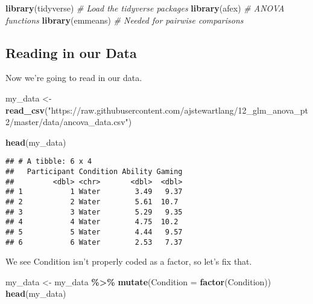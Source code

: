 \documentclass[
]{book}
\newenvironment{Shaded}{\begin{snugshade}}{\end{snugshade}}
\newcommand{\AttributeTok}[1]{\textcolor[rgb]{0.13,0.29,0.53}{#1}}
\newcommand{\CommentTok}[1]{\textcolor[rgb]{0.56,0.35,0.01}{\textit{#1}}}
\newcommand{\FunctionTok}[1]{\textcolor[rgb]{0.13,0.29,0.53}{\textbf{#1}}}
\newcommand{\NormalTok}[1]{#1}
\newcommand{\OtherTok}[1]{\textcolor[rgb]{0.56,0.35,0.01}{#1}}
\newcommand{\SpecialCharTok}[1]{\textcolor[rgb]{0.81,0.36,0.00}{\textbf{#1}}}
\newcommand{\StringTok}[1]{\textcolor[rgb]{0.31,0.60,0.02}{#1}}
\begin{document}
\begin{Shaded}
\begin{Highlighting}[]
\FunctionTok{library}\NormalTok{(tidyverse) }\CommentTok{\# Load the tidyverse packages}
\FunctionTok{library}\NormalTok{(afex) }\CommentTok{\# ANOVA functions}
\FunctionTok{library}\NormalTok{(emmeans) }\CommentTok{\# Needed for pairwise comparisons}
\end{Highlighting}
\end{Shaded}

\hypertarget{reading-in-our-data-3}{%
\subsection{Reading in our Data}\label{reading-in-our-data-3}}

Now we're going to read in our data.

\begin{Shaded}
\begin{Highlighting}[]
\NormalTok{my\_data }\OtherTok{\textless{}{-}} \FunctionTok{read\_csv}\NormalTok{(}\StringTok{"https://raw.githubusercontent.com/ajstewartlang/12\_glm\_anova\_pt2/master/data/ancova\_data.csv"}\NormalTok{)}
\end{Highlighting}
\end{Shaded}

\begin{Shaded}
\begin{Highlighting}[]
\FunctionTok{head}\NormalTok{(my\_data)}
\end{Highlighting}
\end{Shaded}

\begin{verbatim}
## # A tibble: 6 x 4
##   Participant Condition Ability Gaming
##         <dbl> <chr>       <dbl>  <dbl>
## 1           1 Water        3.49   9.37
## 2           2 Water        5.61  10.7 
## 3           3 Water        5.29   9.35
## 4           4 Water        4.75  10.2 
## 5           5 Water        4.44   9.57
## 6           6 Water        2.53   7.37
\end{verbatim}

We see Condition isn't properly coded as a factor, so let's fix that.

\begin{Shaded}
\begin{Highlighting}[]
\NormalTok{my\_data }\OtherTok{\textless{}{-}}\NormalTok{ my\_data }\SpecialCharTok{\%\textgreater{}\%} 
  \FunctionTok{mutate}\NormalTok{(}\AttributeTok{Condition =} \FunctionTok{factor}\NormalTok{(Condition))}
\FunctionTok{head}\NormalTok{(my\_data)}
\end{Highlighting}
\end{Shaded}
\end{document}
